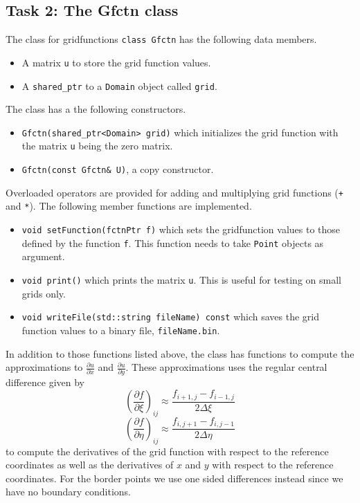 \documentclass[a4paper,10pt]{article}
\begin{document}
\subsection*{Task 2: The Gfctn class}
The class for gridfunctions \texttt{class Gfctn} has the following data members.
\begin{itemize}
  \item
    A matrix \texttt{u} to store the grid function values.
  \item
    A \texttt{shared\_ptr} to a \texttt{Domain} object called \texttt{grid}.
\end{itemize}
The class has a the following constructors.
\begin{itemize}
  \item \texttt{Gfctn(shared\_ptr<Domain> grid)} which initializes the grid function with
    the matrix \texttt{u} being the zero matrix.
  \item \texttt{Gfctn(const Gfctn\& U)}, a copy constructor.
\end{itemize}
Overloaded operators are provided for adding and multiplying grid functions (\texttt{+} and 
\texttt{*}).
The following member functions are implemented.
\begin{itemize}
  \item
    \texttt{void setFunction(fctnPtr f)} which sets the gridfunction values to those
    defined by the function \texttt{f}. This function needs to take \texttt{Point}
    objects as argument.
  \item
    \texttt{void print()} which prints the matrix \texttt{u}.
    This is useful for testing on small grids only.
  \item
    \texttt{void writeFile(std::string fileName) const} which saves the grid function
    values to a binary file, \texttt{fileName.bin}.
\end{itemize}
In addition to those functions listed above, the class has functions to compute 
the approximations to $\tfrac{\partial u}{\partial x}$ and $\tfrac{\partial u}{\partial y}$. These approximations uses the regular central difference given by
$$\left( \frac{\partial f}{\partial \xi} \right)_{ij} \approx \frac{f_{i+1,j}-f_{i-1,j}}{2 \Delta \xi} $$ 
$$\left(\frac{\partial f}{\partial \eta}\right)_{ij} \approx \frac{f_{i,j+1}-f_{i,j-1}}{2 \Delta \eta} $$ 
to compute the derivatives of the grid function with respect to the reference coordinates as well as the derivatives of $x$ and $y$ with respect to the reference coordinates. For the border points we use one sided differences instead since we have no boundary conditions.
\end{document}
